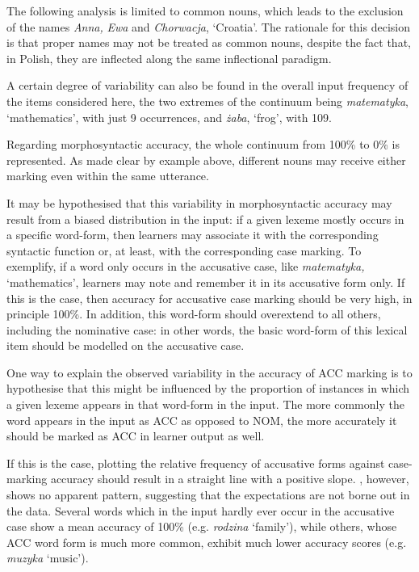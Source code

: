 The following analysis is limited to common nouns, which leads to the exclusion of the names \textit{Anna,} \textit{Ewa} and \textit{Chorwacja}, ‘Croatia’. The rationale for this decision is that proper names may not be treated as common nouns, despite the fact that, in Polish, they are inflected  along the same inflectional paradigm. 

A certain degree of variability can also be found in the overall input frequency of the items considered here, the two extremes of the continuum being \textit{matematyka}, ‘mathematics’, with just 9 occurrences, and \textit{żaba}, ‘frog’, with 109. 

Regarding morphosyntactic accuracy, the whole continuum from 100\% to 0\% is represented. As made clear by example  above, different nouns may receive either marking even within the same utterance. 

It may be hypothesised that this variability in morphosyntactic accuracy may result from a biased distribution in the input: if a given lexeme mostly occurs in a specific word-form, then learners may associate it with the corresponding syntactic function or, at least, with the corresponding case marking. To exemplify, if a word only occurs in the accusative case, like \textit{matematyka,} ‘mathematics’, learners may note and remember it in its accusative form only. If this is the case, then accuracy for accusative case marking should be very high, in principle 100\%. In addition, this word-form should overextend to all others, including the nominative case: in other words, the basic word-form of this lexical item should be modelled on the accusative case.

One way to explain the observed variability in the accuracy of ACC marking is to hypothesise that this might be influenced by the proportion of instances in which a given lexeme appears in that word-form in the input. The more commonly the word appears in the input as ACC as opposed to NOM, the more accurately it should be marked as ACC in learner output as well.

If this is the case, plotting the relative frequency of accusative forms against case-marking accuracy should result in a straight line with a positive slope. , however, shows no apparent pattern, suggesting that the expectations are not borne out in the data. Several words which in the input hardly ever occur in the accusative case show a mean accuracy of 100\% (e.g. \textit{rodzina} ‘family’), while others, whose ACC word form is much more common, exhibit much lower accuracy scores (e.g. \textit{muzyka} ‘music’).

